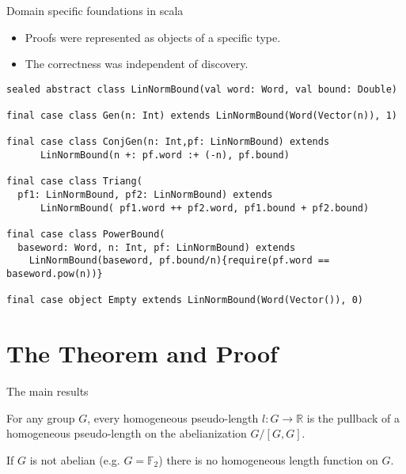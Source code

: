 \documentclass[aspectratio=1610,17pt, ucs]{beamer}
\newcommand{\R}{\mathbb{R}}
\begin{document}
\begin{frame}[fragile]{Domain specific foundations in scala}
 
  {\small 
  \begin{itemize}
    \item Proofs were represented as \alert{objects} of a specific \alert{type}.
    \item The \alert{correctness} was independent of \alert{discovery}. 
  \end{itemize}
  }
  \pause
  \begin{lstlisting}
sealed abstract class LinNormBound(val word: Word, val bound: Double)

final case class Gen(n: Int) extends LinNormBound(Word(Vector(n)), 1)

final case class ConjGen(n: Int,pf: LinNormBound) extends
      LinNormBound(n +: pf.word :+ (-n), pf.bound)

final case class Triang(
  pf1: LinNormBound, pf2: LinNormBound) extends
      LinNormBound( pf1.word ++ pf2.word, pf1.bound + pf2.bound)

final case class PowerBound(
  baseword: Word, n: Int, pf: LinNormBound) extends
    LinNormBound(baseword, pf.bound/n){require(pf.word == baseword.pow(n))}

final case object Empty extends LinNormBound(Word(Vector()), 0)
  \end{lstlisting}

\end{frame}

\section{The Theorem and Proof}

\begin{frame}{The main results}
  \begin{theorem}
    For any group $G$, every homogeneous pseudo-length $l: G \to \R$ is the pullback of a homogeneous pseudo-length on the abelianization $G/ [G, G]$. 
  \end{theorem}

  \pause 

  \begin{corollary}
    If $G$ is not abelian (e.g. $G = \mathbb{F}_2$) there is no homogeneous length function on $G$.
  \end{corollary}

\end{frame}
\end{document}
